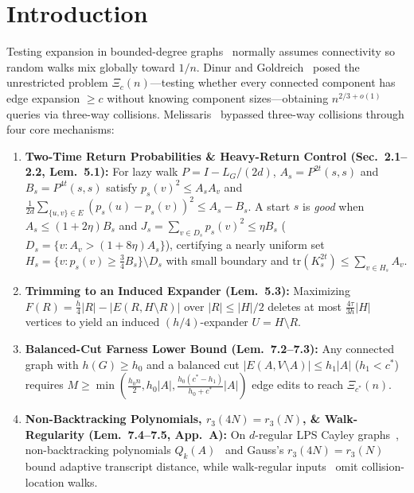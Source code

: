 \documentclass[10pt,twocolumn]{article}
\begin{document}
\section{Introduction}\label{sec:intro}
Testing expansion in bounded-degree graphs~\cite{goldreich2002property,kale2011expansion} normally assumes connectivity so random walks mix globally toward $1/n$. Dinur and Goldreich~\cite{dinur2025expansion} posed the unrestricted problem $\Xi_c(n)$---testing whether every connected component has edge expansion $\ge c$ without knowing component sizes---obtaining $n^{2/3+o(1)}$ queries via three-way collisions. Melissaris~\cite{melissaris2026testing} bypassed three-way collisions through four core mechanisms:
\begin{enumerate}[leftmargin=*,nosep]
  \item \textbf{Two-Time Return Probabilities \& Heavy-Return Control (Sec.~2.1--2.2, Lem.~5.1):} For lazy walk $P = I - L_G/(2d)$, $A_s = P^{2t}(s,s)$ and $B_s = P^{4t}(s,s)$ satisfy $p_s(v)^2 \le A_s A_v$ and $\frac{1}{2d}\sum_{\{u,v\}\in E}(p_s(u)-p_s(v))^2 \le A_s - B_s$. A start $s$ is \emph{good} when $A_s \le (1+2\eta)B_s$ and $J_s = \sum_{v\in D_s} p_s(v)^2 \le \eta B_s$ ($D_s = \{v : A_v > (1+8\eta)A_s\}$), certifying a nearly uniform set $H_s = \{v : p_s(v) \ge \frac{3}{4}B_s\} \setminus D_s$ with small boundary and $\mathrm{tr}(K_s^{2t}) \le \sum_{v\in H_s} A_v$.
  \item \textbf{Trimming to an Induced Expander (Lem.~5.3):} Maximizing $F(R) = \frac{h}{4}|R| - |E(R, H\setminus R)|$ over $|R| \le |H|/2$ deletes at most $\frac{4\tau}{3h}|H|$ vertices to yield an induced $(h/4)$-expander $U = H \setminus R$.
  \item \textbf{Balanced-Cut Farness Lower Bound (Lem.~7.2--7.3):} Any connected graph with $h(G) \ge h_0$ and a balanced cut $|E(A, V\setminus A)| \le h_1|A|$ ($h_1 < c^*$) requires $M \ge \min(\frac{h_0 n}{2}, h_0|A|, \frac{h_0(c^*-h_1)}{h_0+c^*}|A|)$ edge edits to reach $\Xi_{c^*}(n)$.
  \item \textbf{Non-Backtracking Polynomials, $r_3(4N)=r_3(N)$, \& Walk-Regularity (Lem.~7.4--7.5, App.~A):} On $d$-regular LPS Cayley graphs~\cite{lubotzky1988ramanujan}, non-backtracking polynomials $Q_k(A)$~\cite{alon2007nonbacktracking} and Gauss's $r_3(4N)=r_3(N)$~\cite{filaseta2026extreme} bound adaptive transcript distance, while walk-regular inputs~\cite{godsil1980walkregular} omit collision-location walks.
\end{enumerate}
\end{document}
